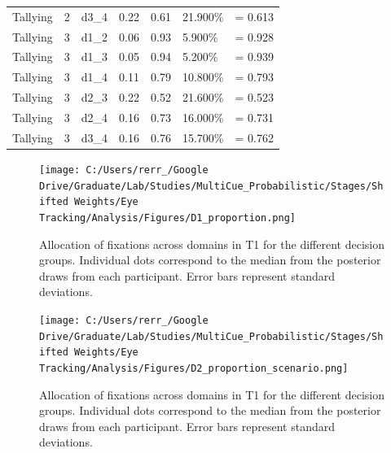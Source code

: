 \documentclass[
  english,
  man]{apa6}
\begin{document}
\begin{center}
\begin{ThreePartTable}
\begin{longtable}{lllllll}
Tallying & 2 & d3\_4 & 0.22 & 0.61 & 21.900\% & = 0.613\\
Tallying & 3 & d1\_2 & 0.06 & 0.93 & 5.900\% & = 0.928\\
Tallying & 3 & d1\_3 & 0.05 & 0.94 & 5.200\% & = 0.939\\
Tallying & 3 & d1\_4 & 0.11 & 0.79 & 10.800\% & = 0.793\\
Tallying & 3 & d2\_3 & 0.22 & 0.52 & 21.600\% & = 0.523\\
Tallying & 3 & d2\_4 & 0.16 & 0.73 & 16.000\% & = 0.731\\
Tallying & 3 & d3\_4 & 0.16 & 0.76 & 15.700\% & = 0.762\\
\bottomrule
\end{longtable}

\end{ThreePartTable}
\end{center}

\begin{figure}
\centering
\texttt{[image: C:/Users/rerr\_/Google Drive/Graduate/Lab/Studies/MultiCue\_Probabilistic/Stages/Shifted Weights/Eye Tracking/Analysis/Figures/D1\_proportion.png]}
\caption{\label{fig:proportion}Allocation of fixations across domains in T1 for the different decision groups. Individual dots correspond to the median from the posterior draws from each participant. Error bars represent standard deviations.}
\end{figure}

\begin{figure}
\centering
\texttt{[image: C:/Users/rerr\_/Google Drive/Graduate/Lab/Studies/MultiCue\_Probabilistic/Stages/Shifted Weights/Eye Tracking/Analysis/Figures/D2\_proportion\_scenario.png]}
\caption{\label{fig:proportion-scenario}Allocation of fixations across domains in T1 for the different decision groups. Individual dots correspond to the median from the posterior draws from each participant. Error bars represent standard deviations.}
\end{figure}
\end{document}
